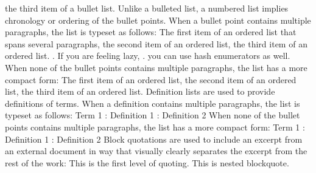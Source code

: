\markdownRendererUlItem the third item of a bullet list.\markdownRendererUlItemEnd 
\markdownRendererUlEndTight \markdownRendererInterblockSeparator
{}Unlike a bulleted list, a numbered list implies chronology or ordering of the bullet points. When a bullet point contains multiple paragraphs, the list is typeset as follows:\markdownRendererInterblockSeparator
{}\markdownRendererOlBegin
{}The first item of an ordered list\markdownRendererInterblockSeparator
{}that spans several paragraphs,\markdownRendererOlItemEnd 
{}the second item of an ordered list,\markdownRendererOlItemEnd 
{}the third item of an ordered list. \markdownRendererHash{}. If you are feeling lazy, \markdownRendererHash{}. you can use hash enumerators as well.\markdownRendererOlItemEnd 
\markdownRendererOlEnd \markdownRendererInterblockSeparator
{}When none of the bullet points contains multiple paragraphs, the list has a more compact form:\markdownRendererInterblockSeparator
{}\markdownRendererOlBeginTight
{}The first item of an ordered list,\markdownRendererOlItemEnd 
{}the second item of an ordered list,\markdownRendererOlItemEnd 
{}the third item of an ordered list.\markdownRendererOlItemEnd 
\markdownRendererOlEndTight \markdownRendererInterblockSeparator
{}Definition lists are used to provide definitions of terms. When a definition contains multiple paragraphs, the list is typeset as follows:\markdownRendererInterblockSeparator
{}Term 1\markdownRendererInterblockSeparator
{}: Definition 1\markdownRendererInterblockSeparator
{}\markdownRendererInterblockSeparator
{}: Definition 2\markdownRendererInterblockSeparator
{}\markdownRendererInterblockSeparator
{}When none of the bullet points contains multiple paragraphs, the list has a more compact form:\markdownRendererInterblockSeparator
{}Term 1 : Definition 1  : Definition 2\markdownRendererInterblockSeparator
{}Block quotations are used to include an excerpt from an external document in way that visually clearly separates the excerpt from the rest of the work:\markdownRendererInterblockSeparator
{}\markdownRendererBlockQuoteBegin
This is the first level of quoting.\markdownRendererInterblockSeparator
{}\markdownRendererBlockQuoteBegin
This is nested blockquote.
\markdownRendererBlockQuoteEnd \markdownRendererInterblockSeparator
